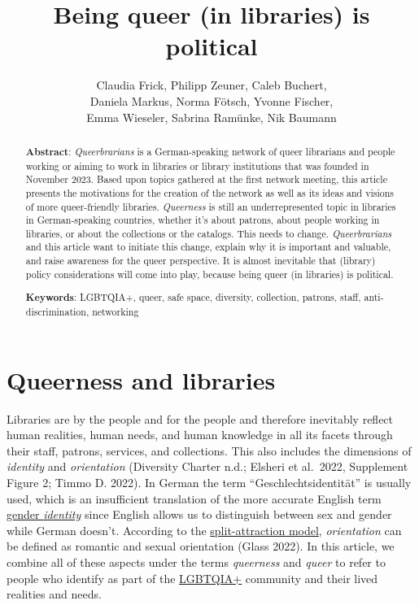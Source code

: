 \documentclass[a4paper,
fontsize=11pt,
oneside,
numbers=noperiodatend,
parskip=half-,
bibliography=totoc,
final
]{scrartcl}
\title{\LARGE{Being queer (in libraries) is political}}%
\author{Claudia Frick, Philipp Zeuner, Caleb Buchert,\\ Daniela Markus, Norma Fötsch, Yvonne Fischer,\\ Emma Wieseler, Sabrina Ramünke, Nik Baumann} %
\date{}
\begin{document}
\maketitle
\thispagestyle{fancyplain} 

\begin{abstract}
\noindent
\textbf{Abstract}: \textit{Queerbrarians} is a German-speaking network of
queer librarians and people working or aiming to work in libraries or
library institutions that was founded in November 2023. Based upon
topics gathered at the first network meeting, this article presents the
motivations for the creation of the network as well as its ideas and
visions of more queer-friendly libraries. \textit{Queerness} is still an
underrepresented topic in libraries in German-speaking countries,
whether it's about patrons, about people working in libraries, or about
the collections or the catalogs. This needs to change. \textit{Queerbrarians} and
this article want to initiate this change, explain why it is important
and valuable, and raise awareness for the queer perspective. It is
almost inevitable that (library) policy considerations will come into
play, because being queer (in libraries) is political.
\end{abstract}

\begin{abstract}
\noindent
\textbf{Keywords}: LGBTQIA+, queer, safe space, diversity, collection, patrons, staff, anti-discrimination, networking
\end{abstract}

\hypertarget{queerness-and-libraries}{%
\section{Queerness and libraries}\label{queerness-and-libraries}}

Libraries are by the people and for the people and therefore inevitably
reflect human realities, human needs, and human knowledge in all its
facets through their staff, patrons, services, and collections. This
also includes the dimensions of \emph{identity} and \emph{orientation}
(Diversity Charter n.d.; Elsheri et al.~2022, Supplement Figure 2; Timmo
D. 2022). In German the term
\enquote{Geschlechtsidentität} is usually used,
which is an insufficient translation of the more accurate English term
\href{https://lgbtqia.fandom.com/wiki/Gender\_identity}{gender \textit{identity}}
since English allows us to distinguish between sex and gender while
German doesn't. According to the
\href{https://lgbtqia.mywikis.wiki/wiki/Split_Attraction_Model}{split-attraction
model}, \emph{orientation} can be defined as romantic and sexual
orientation (Glass 2022). In this article, we combine all of these
aspects under the terms \emph{queerness} and \emph{queer} to refer to
people who identify as part of the
\href{https://lgbtqia.mywikis.wiki/wiki/LGBT}{LGBTQIA+} community and
their lived realities and needs.
\end{document}
